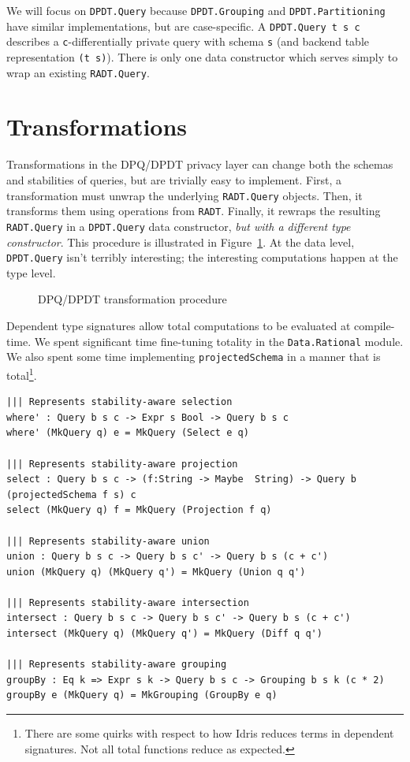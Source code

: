 \documentclass[12pt]{report}
\begin{document}
We will focus on \texttt{DPDT.Query} because \texttt{DPDT.Grouping} and \texttt{DPDT.Partitioning} have similar implementations, but are case-specific.
A \texttt{DPDT.Query t s c} describes a \texttt{c}-differentially private query with schema \texttt{s} (and backend table representation \texttt{(t s)}).
There is only one data constructor which serves simply to wrap an existing \texttt{RADT.Query}.

\section{Transformations}

Transformations in the DPQ/DPDT privacy layer can change both the schemas and stabilities of queries, but are trivially easy to implement.
First, a transformation must unwrap the underlying \texttt{RADT.Query} objects.
Then, it transforms them using operations from \texttt{RADT}.
Finally, it rewraps the resulting \texttt{RADT.Query} in a \texttt{DPDT.Query} data constructor, \textit{but with a different type constructor}.
This procedure is illustrated in Figure~\ref{fig:query_wrapping}.
At the data level, \texttt{DPDT.Query} isn't terribly interesting; the interesting computations happen at the type level.

\begin{figure}
     \centering
     \def\svgwidth{1\linewidth}
     
     \caption{DPQ/DPDT transformation procedure}
     \label{fig:query_wrapping}
\end{figure}

Dependent type signatures allow total computations to be evaluated at compile-time.
We spent significant time fine-tuning totality in the \texttt{Data.Rational} module.
We also spent some time implementing \texttt{projectedSchema} in a manner that is total\footnote{There are some quirks with respect to how Idris reduces terms in dependent signatures. Not all total functions reduce as expected.}.

\begin{lstlisting}[float,caption={Representing privacy-aware transformations},label={lst:transformations}]
||| Represents stability-aware selection
where' : Query b s c -> Expr s Bool -> Query b s c
where' (MkQuery q) e = MkQuery (Select e q)

||| Represents stability-aware projection
select : Query b s c -> (f:String -> Maybe  String) -> Query b (projectedSchema f s) c
select (MkQuery q) f = MkQuery (Projection f q)

||| Represents stability-aware union
union : Query b s c -> Query b s c' -> Query b s (c + c')
union (MkQuery q) (MkQuery q') = MkQuery (Union q q')

||| Represents stability-aware intersection
intersect : Query b s c -> Query b s c' -> Query b s (c + c')
intersect (MkQuery q) (MkQuery q') = MkQuery (Diff q q')

||| Represents stability-aware grouping
groupBy : Eq k => Expr s k -> Query b s c -> Grouping b s k (c * 2)
groupBy e (MkQuery q) = MkGrouping (GroupBy e q)
\end{lstlisting}
\end{document}
